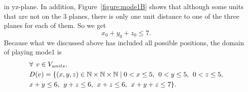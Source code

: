 in yz-plane. In addition, Figure~\ref{figure:mode1B} shows that although some units that are not on the 3 planes, there is only one unit distance to one of the three planes for each of them. So we get
\begin{equation}
x_{0}+y_{0}+z_{0}\leq7.
\end{equation}
Because what we discussed above has included all possible positions, the domain of playing mode1 is
\begin{equation}
\begin{aligned}
&\forall \hspace{1ex} v \in V_{units},\\
&D(v)=\{(x,y,z) \in \mathbb{N} \times \mathbb{N}	\times \mathbb{N} \mid  0<x \leq 5, \hspace{1ex} 0<y \leq 5,\hspace{1ex} 0<z \leq 5,\\ &x+y\leq 6,\hspace{1ex} y+z\leq 6,\hspace{1ex}x+z\leq 6,\hspace{1ex}x+y+z\leq 7\}.
\end{aligned}
\end{equation}
